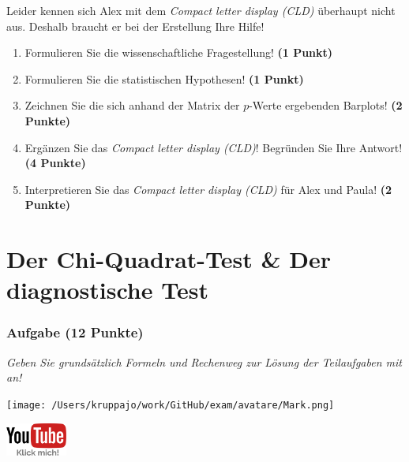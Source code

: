 \documentclass[a4paper, 9pt]{scrartcl}\usepackage[]{graphicx}\usepackage[]{xcolor}
\begin{document}
Leider kennen sich Alex mit dem \textit{Compact letter display (CLD)} überhaupt nicht aus. Deshalb braucht er bei der Erstellung Ihre Hilfe!

\begin{enumerate}
  \item Formulieren Sie die wissenschaftliche Fragestellung! \textbf{(1 Punkt)}
  \item Formulieren Sie die statistischen Hypothesen! \textbf{(1 Punkt)}
\item Zeichnen Sie die sich anhand der Matrix der $p$-Werte ergebenden Barplots! \textbf{(2 Punkte)}
\item Ergänzen Sie das \textit{Compact letter display (CLD)}! Begründen Sie Ihre Antwort! \textbf{(4 Punkte)}
\item Interpretieren Sie das \textit{Compact letter display (CLD)} für Alex und Paula! \textbf{(2 Punkte)} 
\end{enumerate}

 
\clearpage
\part{Der Chi-Quadrat-Test \& Der diagnostische Test}

\section{Aufgabe \hfill (12 Punkte)}

\textit{Geben Sie grundsätzlich Formeln und Rechenweg zur Lösung der Teilaufgaben mit an!} \\[1Ex]
 

 
\begin{minipage}[t]{0.5\textwidth}
\texttt{[image: /Users/kruppajo/work/GitHub/exam/avatare/Mark.png]}
\end{minipage}
\begin{minipage}[t]{0.5\textwidth}
\hfill
\href{https://youtu.be/-Kva5wc5Elw}{\includegraphics[width = 2cm]{img/youtube}}
\end{minipage}
\vspace{-3Ex}
\end{document}
